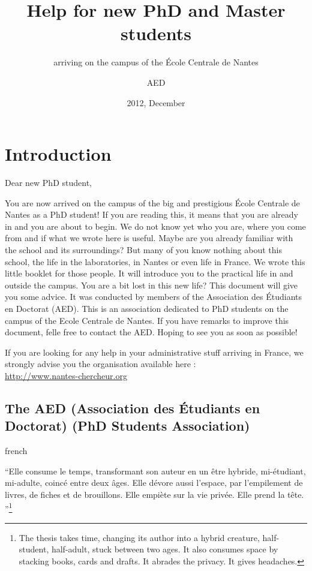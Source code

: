 \documentclass[12pt, english, squeezeCommittee, fancyChapter, fancyPart]{these-LUNAM}
\title{Help for new PhD and Master students}
\subtitle{arriving on the campus of the \'Ecole Centrale de Nantes}
\author{AED}{PhD Students Association}{(AED)}
\date{2012, December}
\begin{document}
\maketitle

\tableofcontents

\frontmatter
\chapter*{Introduction}
Dear new PhD student,

You are now arrived on the campus of the big and prestigious École Centrale de Nantes as a PhD student! %
If you are reading this, it means that you are already in and you are about to begin.
We do not know yet who you are, where you come from and if what we wrote here is useful.
Maybe are you already familiar with the school and its surroundings?
But many of you know nothing about this school, the life in the laboratories, in Nantes or even life in France.
We wrote this little booklet for those people.
It will introduce you to the practical life in and outside the campus.
You are a bit lost in this new life? This document will give you some advice.
It was conducted by members of the Association des Étudiants en Doctorat (AED). This is an association dedicated to PhD students on the campus of the Ecole Centrale de Nantes.
If you have remarks to improve this document, felle free to contact the AED.
Hoping to see you as soon as possible!


If you are looking for any help in your administrative stuff arriving in France, we strongly advise you the organisation available here :\\
\url{http://www.nantes-chercheur.org}

\section*{The AED (Association des Étudiants en Doctorat) (PhD Students Association)}
\begin{foreigndisplayquote}{french}
\begin{small}
``Elle consume le temps, transformant son auteur en un être hybride, mi-étudiant, mi-adulte, coincé entre deux âges.
Elle dévore aussi l’espace, par l’empilement de livres, de fiches et de brouillons. Elle empiète sur la vie privée. Elle prend la tête.
''\footnote{The thesis takes time, changing its author into a hybrid creature, half-student, half-adult, stuck between two ages.
It also consumes space by stacking books, cards and drafts. It abrades the privacy. It gives headaches.}
\end{small}
\end{foreigndisplayquote}
\end{document}
